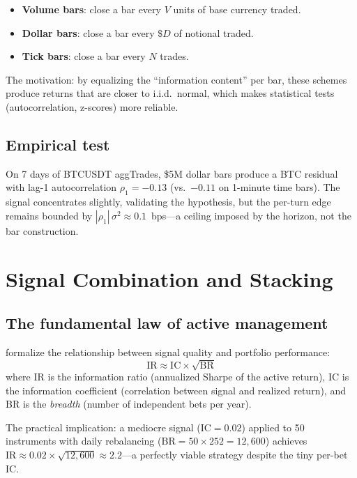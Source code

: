 \documentclass[11pt,a4paper]{article}
\begin{document}
\begin{itemize}[leftmargin=1.5em]
  \item \textbf{Volume bars}: close a bar every $V$ units of base
        currency traded.
  \item \textbf{Dollar bars}: close a bar every $\$D$ of notional
        traded.
  \item \textbf{Tick bars}: close a bar every $N$ trades.
\end{itemize}

The motivation: by equalizing the ``information content'' per bar,
these schemes produce returns that are closer to i.i.d.\ normal,
which makes statistical tests (autocorrelation, z-scores) more
reliable.

\subsection{Empirical test}

On 7 days of BTCUSDT aggTrades, \$5M dollar bars produce a BTC
residual with lag-1 autocorrelation $\rho_1 = -0.13$ (vs.\ $-0.11$ on
1-minute time bars). The signal concentrates slightly, validating the
hypothesis, but the per-turn edge remains bounded by
$|\rho_1|\,\sigma^2 \approx 0.1$~bps---a ceiling imposed by the
horizon, not the bar construction.

\section{Signal Combination and Stacking}
\label{sec:stacking}

\subsection{The fundamental law of active management}

\citet{grinold2000active} formalize the relationship between signal
quality and portfolio performance:
\begin{equation}
  \mathrm{IR} \approx \mathrm{IC} \times \sqrt{\mathrm{BR}}
  \label{eq:fundamental-law}
\end{equation}
where IR is the information ratio (annualized Sharpe of the active
return), IC is the information coefficient (correlation between signal
and realized return), and BR is the \emph{breadth} (number of
independent bets per year).

The practical implication: a mediocre signal ($\mathrm{IC} = 0.02$)
applied to 50 instruments with daily rebalancing
($\mathrm{BR} = 50 \times 252 = 12{,}600$) achieves
$\mathrm{IR} \approx 0.02 \times \sqrt{12{,}600} \approx 2.2$---a
perfectly viable strategy despite the tiny per-bet IC.
\end{document}
